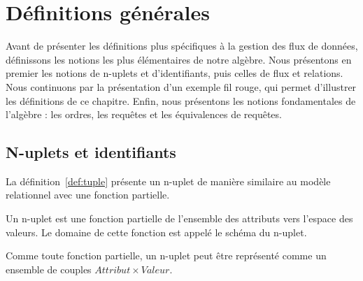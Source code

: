 \section{Définitions générales}\label{sec:contrib:astral:definitions}
Avant de présenter les définitions plus spécifiques à la gestion des flux de données, définissons les notions les plus élémentaires de notre algèbre. Nous présentons en premier les notions de n-uplets et d'identifiants, puis celles de flux et relations. Nous continuons par la présentation d'un exemple fil rouge, qui permet d'illustrer les définitions de ce chapitre. Enfin, nous présentons les notions fondamentales de l'algèbre : les ordres, les requêtes et les équivalences de requêtes.

\subsection{N-uplets et identifiants}
La définition~\ref{def:tuple} présente un n-uplet de manière similaire au modèle relationnel avec une fonction partielle.
\begin{defi}[n-uplet]\label{def:tuple}
    Un n-uplet est une fonction partielle de l'ensemble des attributs vers l'espace des valeurs. Le domaine de cette fonction est appelé le schéma du n-uplet.
    
    Comme toute fonction partielle, un n-uplet peut être représenté comme un ensemble de couples $Attribut\times Valeur$.
\end{defi}

